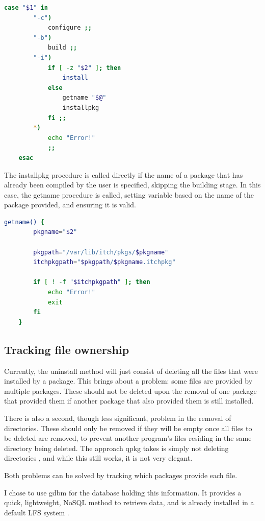 \documentclass[10pt]{article}
\begin{document}
\begin{lstlisting}[language=bash]
    case "$1" in
        "-c")
            configure ;;
        "-b")
            build ;;
        "-i")
            if [ -z "$2" ]; then
                install
            else
                getname "$@"
                installpkg
            fi ;;
        *)
            echo "Error!"
            ;;
    esac
\end{lstlisting}

The installpkg procedure is called directly if the name of a package that has already been compiled by the user is specified, skipping the building stage. In this case, the getname procedure is called, setting variable based on the name of the package provided, and ensuring it is valid.

\begin{lstlisting}[language=bash]
    getname() {
        pkgname="$2"

        pkgpath="/var/lib/itch/pkgs/$pkgname"
        itchpkgpath="$pkgpath/$pkgname.itchpkg"

        if [ ! -f "$itchpkgpath" ]; then
            echo "Error!"
            exit
        fi
    }
\end{lstlisting}

\subsection{Tracking file ownership}

Currently, the uninstall method will just consist of deleting all the files that were installed by a package. This brings about a problem: some files are provided by multiple packages. These should not be deleted upon the removal of one package that provided them if another package that also provided them is still installed.

There is also a second, though less significant, problem in the removal of directories. These should only be removed if they will be empty once all files to be deleted are removed, to prevent another program's files residing in the same directory being deleted. The approach qpkg takes is simply not deleting directories \cite{qpkg}, and while this still works, it is not very elegant.

Both problems can be solved by tracking which packages provide each file.

I chose to use gdbm \cite{gdbmManual} for the database holding this information. It provides a quick, lightweight, NoSQL method to retrieve data, and is already installed in a default LFS system \cite{gdbmLFS}.
\end{document}

